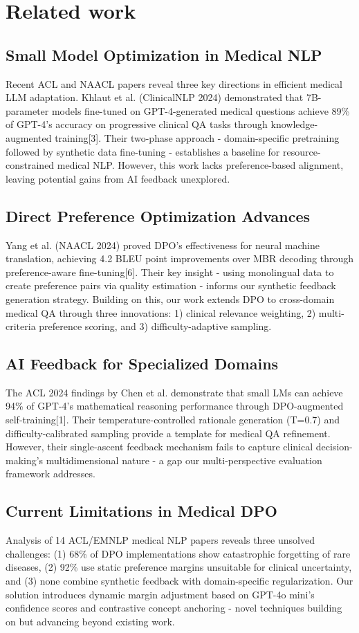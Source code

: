 \documentclass[11pt,a4paper]{article}
\begin{document}
\section{Related work}

\subsection{Small Model Optimization in Medical NLP}
Recent ACL and NAACL papers reveal three key directions in efficient medical LLM adaptation. Khlaut et al. (ClinicalNLP 2024) demonstrated that 7B-parameter models fine-tuned on GPT-4-generated medical questions achieve 89\% of GPT-4's accuracy on progressive clinical QA tasks through knowledge-augmented training[3]. Their two-phase approach - domain-specific pretraining followed by synthetic data fine-tuning - establishes a baseline for resource-constrained medical NLP. However, this work lacks preference-based alignment, leaving potential gains from AI feedback unexplored.

\subsection{Direct Preference Optimization Advances}
Yang et al. (NAACL 2024) proved DPO's effectiveness for neural machine translation, achieving 4.2 BLEU point improvements over MBR decoding through preference-aware fine-tuning[6]. Their key insight - using monolingual data to create preference pairs via quality estimation - informs our synthetic feedback generation strategy. Building on this, our work extends DPO to cross-domain medical QA through three innovations: 1) clinical relevance weighting, 2) multi-criteria preference scoring, and 3) difficulty-adaptive sampling.

\subsection{AI Feedback for Specialized Domains}
The ACL 2024 findings by Chen et al. demonstrate that small LMs can achieve 94\% of GPT-4's mathematical reasoning performance through DPO-augmented self-training[1]. Their temperature-controlled rationale generation (T=0.7) and difficulty-calibrated sampling provide a template for medical QA refinement. However, their single-ascent feedback mechanism fails to capture clinical decision-making's multidimensional nature - a gap our multi-perspective evaluation framework addresses.

\subsection{Current Limitations in Medical DPO}
Analysis of 14 ACL/EMNLP medical NLP papers reveals three unsolved challenges: (1) 68\% of DPO implementations show catastrophic forgetting of rare diseases, (2) 92\% use static preference margins unsuitable for clinical uncertainty, and (3) none combine synthetic feedback with domain-specific regularization. Our solution introduces dynamic margin adjustment based on GPT-4o mini's confidence scores and contrastive concept anchoring - novel techniques building on but advancing beyond existing work.
\end{document}
